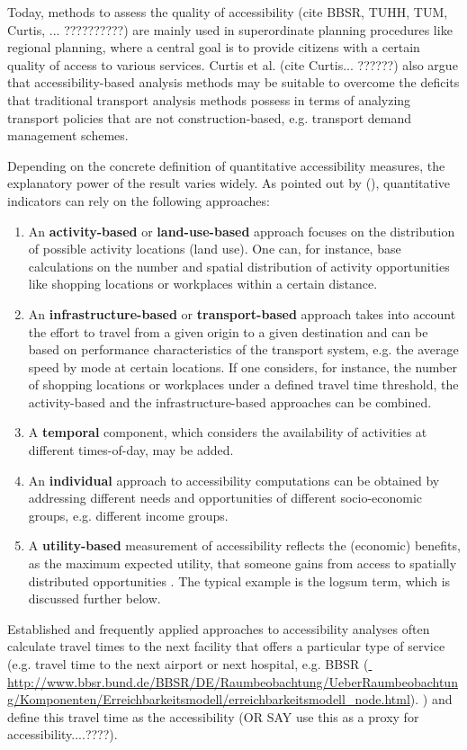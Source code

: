Today, methods to assess the quality of accessibility (cite BBSR, TUHH, TUM, Curtis, ... ??????????) are mainly used in superordinate planning procedures like regional planning, where a central goal is to provide citizens with a certain quality of access to various services. Curtis et al. (cite Curtis... ??????) also argue that accessibility-based analysis methods may be suitable to overcome the deficits that traditional transport analysis methods possess in terms of analyzing transport policies that are not construction-based, e.g. transport demand management schemes.

Depending on the concrete definition of quantitative accessibility measures, the explanatory power of the result varies widely. As pointed out by \citet{NicolaiNagel2012HiResAccessibilityMethodInBook} (\citep[see also][]{GeursRitsema2001AccessibilityMeasures,Geurs2004AccessibilityReview}), quantitative indicators can rely on the following approaches:
%
\begin{enumerate}
\item An \textbf{activity-based} or \textbf{land-use-based} approach focuses on
the distribution of possible activity locations (land use). One can, for instance,
base calculations on the number and spatial distribution of activity opportunities
like shopping locations or workplaces within a certain distance.
%
\item An \textbf{in\-fra\-struc\-ture-based} or \textbf{transport-based} approach takes into account the effort to travel from a given origin to a given destination and 
can be based on performance characteristics of the transport system, e.g. the
average speed by mode at certain locations. If one considers, for instance, the
number of shopping locations or workplaces under a defined travel time threshold,
the activity-based and the infrastructure-based approaches can be combined.
%
\item A \textbf{temporal} component, which considers the availability of activities at different times-of-day, may be added.
%
\item An \textbf{individual} approach to accessibility computations can be
obtained by addressing different needs and opportunities of different socio-economic groups, e.g. different income groups.
%
\item A \textbf{utility-based} measurement of accessibility reflects the
(economic) benefits, as the maximum expected utility, that someone gains
from access to spatially distributed opportunities
\citep{GeursRitsema2001AccessibilityMeasures,deJongEtAl2007LogsumTRA}. The
typical example is the logsum term, which is discussed further below.
\end{enumerate}
%
%
Established and frequently applied approaches to accessibility analyses often calculate travel times to the next facility that offers a particular type of service (e.g. travel time to the next airport or next hospital, e.g. BBSR (\url{	http://www.bbsr.bund.de/BBSR/DE/Raumbeobachtung/UeberRaumbeobachtung/Komponenten/Erreichbarkeitsmodell/erreichbarkeitsmodell_node.html}). ) and define this travel time as the accessibility (OR SAY use this as a proxy for accessibility....????).

